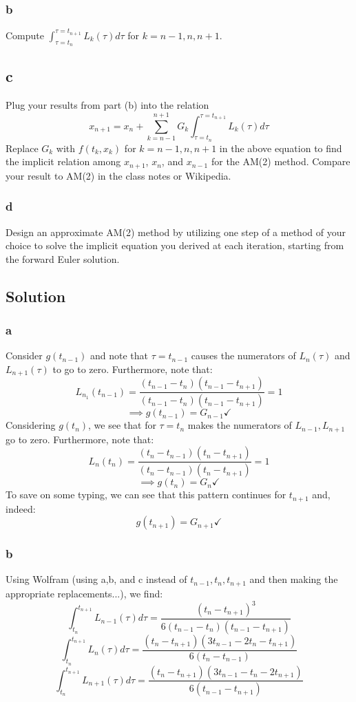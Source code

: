 \documentclass[11pt]{report}
\theoremstyle{definition}
\begin{document}
\subsubsection*{b}
Compute $\int_{\tau=t_n}^{\tau=t_{n+1}}L_{k}(\tau)d\tau$ for $k=n-1,n,n+1$.

\subsection*{c}
Plug your results from part (b) into the relation
\[
	x_{n+1} = x_n + \sum_{k=n-1}^{n+1}G_k\int_{\tau=t_n}^{\tau=t_{n+1}}L_k(\tau)d\tau
\]
Replace $G_k$ with $f(t_k, x_k)$ for $k=n-1,n,n+1$ in the above equation to find
the implicit relation among $x_{n+1}$, $x_n$, and $x_{n-1}$ for the AM(2)
method. Compare your result to AM(2) in the class notes or Wikipedia.

\subsubsection*{d}
Design an approximate AM(2) method by utilizing one step of a method of your
choice to solve the implicit equation you derived at each iteration, starting
from the forward Euler solution.

\subsection*{Solution}
\subsubsection*{a}
Consider $g(t_{n-1})$ and note that $\tau=t_{n-1}$ causes the numerators
of $L_n(\tau)$ and $L_{n+1}(\tau)$ to go to zero. Furthermore,
note that:
\[
	L_{n_1}(t_{n-1}) =
	\frac{(t_{n-1}-t_n)(t_{n-1}-t_{n+1})}{(t_{n-1}-t_n)(t_{n-1}-t_{n+1})}
	= 1
\]
\[ \implies g(t_{n-1})=G_{n-1}\checkmark\]
Considering $g(t_n)$, we see that for $\tau=t_n$ makes the numerators of
$L_{n-1}, L_{n+1}$ go to zero. Furthermore, note that:
\[
	L_{n}  (t_n) = \frac{(t_n-t_{n-1})(t_n-t_{n+1})}{(t_{n}-t_{n-1})(t_{n}-t_{n+1})}
	= 1
\]
\[\implies g(t_n)=G_n\checkmark\]
To save on some typing, we can see that this pattern continues for $t_{n+1}$
and, indeed:
\[g(t_{n+1}) = G_{n+1}\checkmark\]

\subsubsection*{b}
Using Wolfram (using a,b, and c instead of $t_{n-1},t_n,t_{n+1}$ and then making
the appropriate replacements...), we find:
\[\int_{t_n}^{t_{n+1}}L_{n-1}(\tau)d\tau = \frac{(t_n-t_{n+1})^3}{6(t_{n-1}-t_n)(t_{n-1}-t_{n+1})}\]
\[\int_{t_n}^{t_{n+1}}L_{n}(\tau)d\tau = \frac{(t_{n}-t_{n+1})(3t_{n-1}-2t_{n}-t_{n+1})}{6(t_n-t_{n-1})}\]
\[\int_{t_n}^{t_{n+1}}L_{n+1}(\tau)d\tau = \frac{(t_{n}-t_{n+1})(3t_{n-1}-t_{n}-2t_{n+1})}{6(t_{n-1}-t_{n+1})}\]



\newpage
\printbibliography
\end{document}
